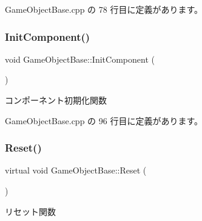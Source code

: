  Game\+Object\+Base.\+cpp の 78 行目に定義があります。

\mbox{\label{class_game_object_base_a5f4d4e3d23603d8e32ddb220a53039a6}} 
\subsubsection{\texorpdfstring{Init\+Component()}{InitComponent()}}
{\footnotesize\ttfamily void Game\+Object\+Base\+::\+Init\+Component (\begin{DoxyParamCaption}{ }\end{DoxyParamCaption})\hspace{0.3cm}{\ttfamily [private]}}



コンポーネント初期化関数 



 Game\+Object\+Base.\+cpp の 96 行目に定義があります。

\mbox{\label{class_game_object_base_a85c59554f734bcb09f1a1e18d9517dce}} 
\subsubsection{\texorpdfstring{Reset()}{Reset()}}
{\footnotesize\ttfamily virtual void Game\+Object\+Base\+::\+Reset (\begin{DoxyParamCaption}{ }\end{DoxyParamCaption})\hspace{0.3cm}{\ttfamily [pure virtual]}}



リセット関数 



